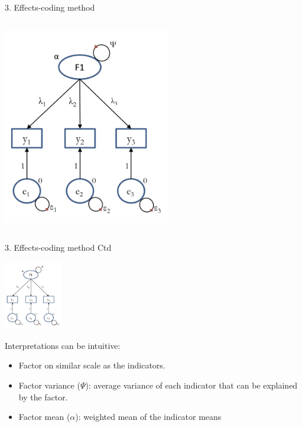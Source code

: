\documentclass[10pt]{beamer}\usepackage[]{graphicx}\usepackage[]{xcolor}
\begin{document}
\begin{frame}{3. Effects-coding method}
\begin{columns}[T]
    \hfill%
    \begin{column}{.34\textwidth}
        \includegraphics[width=\linewidth,height=\textheight,keepaspectratio]{images/slide66.png} 
    \end{column}%
    \end{columns}
    
\end{frame}
%
\begin{frame}{3. Effects-coding method Ctd}
    
    {\centering
    \includegraphics[height=3cm,keepaspectratio]{images/slide66.png} 
    }
        
Interpretations can be intuitive: 
\begin{itemize}
  \item Factor on similar scale as the indicators.
  \item Factor variance ($\Psi$): average variance of each indicator that can be explained by the factor.
  \item Factor mean ($\alpha$): weighted mean of the indicator means
\end{itemize}
    
\end{frame}
\end{document}
